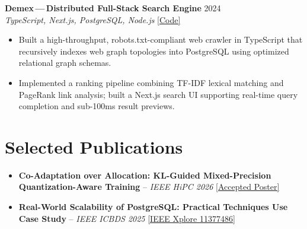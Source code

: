 \documentclass[10pt,a4paper]{article}
\begin{document}
\vspace{0.22em}

\textbf{Demex\,---\,Distributed Full-Stack Search Engine} \hfill 2024\\
\textit{TypeScript, Next.js, PostgreSQL, Node.js} \hfill \href{https://github.com/jayraj-kl/demex-engine}{[\;Code]}
\begin{itemize}
  \item Built a high-throughput, robots.txt-compliant web crawler in TypeScript that recursively indexes web graph topologies into PostgreSQL using optimized relational graph schemas.
  \item Implemented a ranking pipeline combining TF-IDF lexical matching and PageRank link analysis; built a Next.js search UI supporting real-time query completion and sub-100ms result previews.
\end{itemize}

\vspace{-0.15em}

\section{Selected Publications}
\begin{itemize}[leftmargin=1.15em, itemsep=0.1em]
  \item \textbf{Co-Adaptation over Allocation: KL-Guided Mixed-Precision Quantization-Aware Training} -- \textit{IEEE HiPC 2026} \hfill \href{https://drive.google.com/file/d/1wYned37BXW-kTc7B7jNQFcwUzh66sxkG/view?usp=sharing}{[\;Accepted Poster]}
  \item \textbf{Real-World Scalability of PostgreSQL: Practical Techniques Use Case Study} -- \textit{IEEE ICBDS 2025} \hfill \href{https://ieeexplore.ieee.org/document/11377486/}{[\;IEEE Xplore 11377486]}
\end{itemize}
\end{document}

